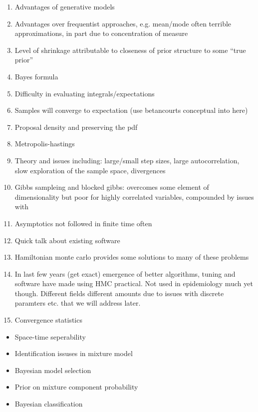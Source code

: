 \documentclass{article}
\begin{document}
\begin{enumerate}
\item Advantages of generative models
\item Advantages over frequentist approaches, e.g. mean/mode often terrible approximations, in part due to concentration of measure
\item Level of shrinkage attributable to closeness of prior structure to some ``true prior''
\item Bayes formula
\item Difficulty in evaluating integrals/expectations
\item Samples will converge to expectation (use betancourts conceptual into here)
\item Proposal density and preserving the pdf
\item Metropolis-hastings
\item Theory and issues including: large/small step sizes, large autocorrelation, slow exploration of the sample space, divergences
\item Gibbs sampleing and blocked gibbs: overcomes some element of dimensionality but poor for highly correlated variables, compounded by issues with 
\item Asymptotics not followed in finite time often
\item Quick talk about existing software
\item Hamiltonian monte carlo provides some solutions to many of these problems
\item In last few years (get exact) emergence of better algorithms, tuning and software have made using HMC practical. Not used in epidemiology much yet though. Different fields different amounts due to issues with discrete paramters etc. that we will address later.
\item Convergence statistics
\end{enumerate}

\begin{itemize}

\item Space-time seperability

\item Identification issuses in mixture model

\item Bayesian model selection

\item Prior on mixture component probability

\item Bayesian classification

\end{itemize}
\end{document}
